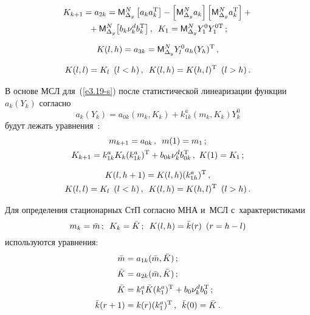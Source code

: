 \begin{multicols}{2}
    \vspace*{-10pt}

    \noindent
    \begin{multline*}
    K_{k+1} = a_{2k} ={\sf M}_{\Delta_y}^N \left[ a_k a_k^{\mathrm{T}}\right] -\left[ {\sf M}_{\Delta_y}^Na_k\right] \left[ {\sf M}_{\Delta_y}^Na_k^{\mathrm{T}}\right]+{}\\
    {}+
     {\sf M}_{\Delta_y}^N\! \left[ b_k \nu_k^d b_k^{\mathrm{T}}\right], \enskip
         K_1 ={\sf M}_{\Delta_y}^N Y_1^0 Y_1^{0\mathrm{T}}\,;
\end{multline*}

\vspace*{-12pt}

    \noindent
    \begin{multline*}
    K(l,h) = a_{3k} = {\sf M}_{\Delta_y}^N Y_l^0 a_h (Y_h)^{\mathrm{T}}\,,
    \\[7pt]
     K(l,l) = K_l\enskip (l<h)\,,\enskip
    K(l,h) = K(h,l)^{\mathrm{T}} \enskip (l>h)\,.
    \end{multline*}

В основе МСЛ для~(\ref{e3.19-s}) после статистической линеаризации функции  $a_k(Y_k)$ согласно
    \begin{equation*}
    a_k\left(Y_k\right) = a_{0k} \left(m_k, K_k\right) + k_{1k}^a \left(m_k, K_k\right) Y_k^0
    \end{equation*}
будут лежать уравнения~\cite{4-s, 10-s}:
   \begin{gather*}
   m_{k+1} = a_{0k}\,,\enskip m(1) = m_1\,; %
   \\
    K_{k+1} = k_{1k}^a K_k (k_{1k}^a)^{\mathrm{T}} + b_{0k} \nu_k^d b_{0k}^{\mathrm{T}}\,,\  K(1)= K_1\,; %
\end{gather*}

\vspace*{-12pt}

\noindent
\begin{multline*}
    K(l,h+1) = K(l,h) (k_{1h}^a)^{\mathrm{T}}\,,
\\
    K(l,l) = K_l \enskip  (l<h)\,,\enskip
     K(l,h) = K(h,l)^{\mathrm{T}}  \enskip (l>h)\,.
    \end{multline*}

Для определения стационарных СтП согласно МНА и~МСЛ с~характеристиками
    \begin{equation*}
    m_k = \bar m\,; \enskip K_k =\bar K\,; \enskip K(l,h) = \bar k(r)\enskip (r=h-l) %
    \end{equation*}
используются уравнения:
    \begin{align*}
    \bar m &= a_{1k} (\bar m,\bar K)\,; %
    \\[2pt]
    \bar K &= a_{2k} (\bar m, \bar K)\,;%
    \\[2pt]
    \bar K &= k_1^a \bar K (k_1^a)^{\mathrm{T}} + b_0 \nu_k^d b_0^{\mathrm{T}}\,; %
    \\[2pt]
    \bar k(r+1)&= k(r) (k_1^a)^{\mathrm{T}}\,,\enskip \bar k(0)=\bar K\,. %
        \end{align*}


\end{multicols}
